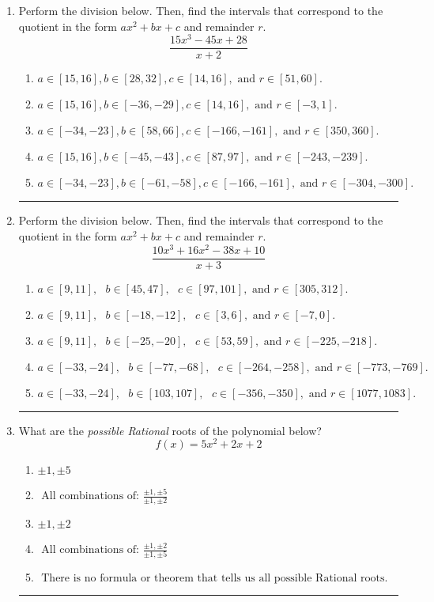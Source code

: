 \documentclass[14pt]{extbook}
\newcommand{\litem}[1]{\item#1\hspace*{-1cm}\rule{\textwidth}{0.4pt}}
\begin{document}
\begin{enumerate}
{\begin{enumerate}[label=\Alph*.]
\end{enumerate} }
\litem{
Perform the division below. Then, find the intervals that correspond to the quotient in the form $ax^2+bx+c$ and remainder $r$.\[ \frac{15x^{3} -45 x + 28}{x + 2} \]\begin{enumerate}[label=\Alph*.]
\item \( a \in [15, 16], b \in [28, 32], c \in [14, 16], \text{ and } r \in [51, 60]. \)
\item \( a \in [15, 16], b \in [-36, -29], c \in [14, 16], \text{ and } r \in [-3, 1]. \)
\item \( a \in [-34, -23], b \in [58, 66], c \in [-166, -161], \text{ and } r \in [350, 360]. \)
\item \( a \in [15, 16], b \in [-45, -43], c \in [87, 97], \text{ and } r \in [-243, -239]. \)
\item \( a \in [-34, -23], b \in [-61, -58], c \in [-166, -161], \text{ and } r \in [-304, -300]. \)

\end{enumerate} }
\litem{
Perform the division below. Then, find the intervals that correspond to the quotient in the form $ax^2+bx+c$ and remainder $r$.\[ \frac{10x^{3} +16 x^{2} -38 x + 10}{x + 3} \]\begin{enumerate}[label=\Alph*.]
\item \( a \in [9, 11], \text{   } b \in [45, 47], \text{   } c \in [97, 101], \text{   and   } r \in [305, 312]. \)
\item \( a \in [9, 11], \text{   } b \in [-18, -12], \text{   } c \in [3, 6], \text{   and   } r \in [-7, 0]. \)
\item \( a \in [9, 11], \text{   } b \in [-25, -20], \text{   } c \in [53, 59], \text{   and   } r \in [-225, -218]. \)
\item \( a \in [-33, -24], \text{   } b \in [-77, -68], \text{   } c \in [-264, -258], \text{   and   } r \in [-773, -769]. \)
\item \( a \in [-33, -24], \text{   } b \in [103, 107], \text{   } c \in [-356, -350], \text{   and   } r \in [1077, 1083]. \)

\end{enumerate} }
\litem{
What are the \textit{possible Rational} roots of the polynomial below?\[ f(x) = 5x^{2} +2 x + 2 \]\begin{enumerate}[label=\Alph*.]
\item \( \pm 1,\pm 5 \)
\item \( \text{ All combinations of: }\frac{\pm 1,\pm 5}{\pm 1,\pm 2} \)
\item \( \pm 1,\pm 2 \)
\item \( \text{ All combinations of: }\frac{\pm 1,\pm 2}{\pm 1,\pm 5} \)
\item \( \text{ There is no formula or theorem that tells us all possible Rational roots.} \)

\end{enumerate} }
\end{enumerate}
\end{document}
